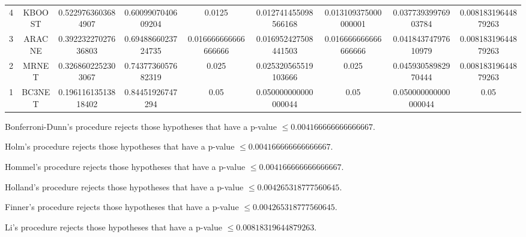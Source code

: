 \documentclass[a4paper,10pt]{article}
\begin{document}
\begin{landscape}
\begin{table}[!htp]
\begin{tabular}{ccccccccc}
4&KBOOST&0.5229763603684907&0.6009907040609204&0.0125&0.012741455098566168&0.013109375000000001&0.03773939976903784&0.00818319644879263\\
3&ARACNE&0.39223227027636803&0.6948866023724735&0.016666666666666666&0.016952427508441503&0.016666666666666666&0.04184374797610979&0.00818319644879263\\
2&MRNET&0.3268602252303067&0.7437736057682319&0.025&0.025320565519103666&0.025&0.04593058982970444&0.00818319644879263\\
1&BC3NET&0.19611613513818402&0.84451926747294&0.05&0.050000000000000044&0.05&0.050000000000000044&0.05\\
\hline
\end{tabular}
\end{table}
Bonferroni-Dunn's procedure rejects those hypotheses that have a p-value $\le0.004166666666666667$.


Holm's procedure rejects those hypotheses that have a p-value $\le0.004166666666666667$.


Hommel's procedure rejects those hypotheses that have a p-value $\le0.004166666666666667$.


Holland's procedure rejects those hypotheses that have a p-value $\le0.004265318777560645$.


Finner's procedure rejects those hypotheses that have a p-value $\le0.004265318777560645$.


Li's procedure rejects those hypotheses that have a p-value $\le0.00818319644879263$.



\newpage


\end{landscape}
\end{document}
